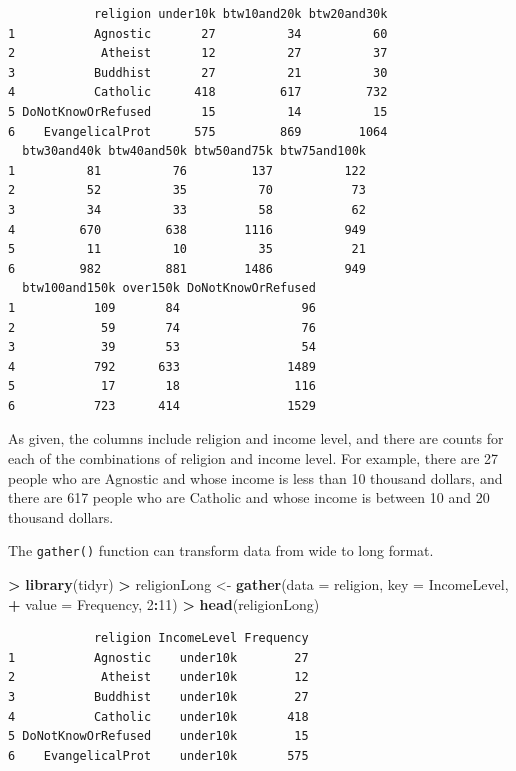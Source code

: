 \documentclass[]{krantz}
\makeatletter
\newenvironment{Shaded}{\begin{snugshade}}{\end{snugshade}}
\newcommand{\KeywordTok}[1]{\textcolor[rgb]{0.27,0.27,0.27}{\textbf{#1}}}
\newcommand{\DataTypeTok}[1]{\textcolor[rgb]{0.27,0.27,0.27}{#1}}
\newcommand{\DecValTok}[1]{\textcolor[rgb]{0.06,0.06,0.06}{#1}}
\newcommand{\StringTok}[1]{\textcolor[rgb]{0.5,0.5,0.5}{#1}}
\newcommand{\OperatorTok}[1]{\textcolor[rgb]{0.43,0.43,0.43}{\textbf{#1}}}
\newcommand{\NormalTok}[1]{#1}
\newenvironment{kframe}{%
\medskip{}
\setlength{\fboxsep}{.8em}
 \def\at@end@of@kframe{}%
 \ifinner\ifhmode%
  \def\at@end@of@kframe{\end{minipage}}%
  \begin{minipage}{\columnwidth}%
 \fi\fi%
 \def\FrameCommand##1{\hskip\@totalleftmargin \hskip-\fboxsep
 \colorbox{shadecolor}{##1}\hskip-\fboxsep
     \hskip-\linewidth \hskip-\@totalleftmargin \hskip\columnwidth}%
 \MakeFramed {\advance\hsize-\width
   \@totalleftmargin\z@ \linewidth\hsize
   \@setminipage}}%
 {\par\unskip\endMakeFramed%
 \at@end@of@kframe}
\renewenvironment{Shaded}{\begin{kframe}}{\end{kframe}}
\makeatother
\begin{document}
\begin{verbatim}
            religion under10k btw10and20k btw20and30k
1           Agnostic       27          34          60
2            Atheist       12          27          37
3           Buddhist       27          21          30
4           Catholic      418         617         732
5 DoNotKnowOrRefused       15          14          15
6    EvangelicalProt      575         869        1064
  btw30and40k btw40and50k btw50and75k btw75and100k
1          81          76         137          122
2          52          35          70           73
3          34          33          58           62
4         670         638        1116          949
5          11          10          35           21
6         982         881        1486          949
  btw100and150k over150k DoNotKnowOrRefused
1           109       84                 96
2            59       74                 76
3            39       53                 54
4           792      633               1489
5            17       18                116
6           723      414               1529
\end{verbatim}

As given, the columns include religion and income level, and there are
counts for each of the combinations of religion and income level. For
example, there are 27 people who are Agnostic and whose income is less
than 10 thousand dollars, and there are 617 people who are Catholic and
whose income is between 10 and 20 thousand dollars.

The \texttt{gather()} function can transform data from wide to long
format.

\begin{Shaded}
\begin{Highlighting}[]
\OperatorTok{>}\StringTok{ }\KeywordTok{library}\NormalTok{(tidyr)}
\OperatorTok{>}\StringTok{ }\NormalTok{religionLong <-}\StringTok{ }\KeywordTok{gather}\NormalTok{(}\DataTypeTok{data =}\NormalTok{ religion, }\DataTypeTok{key =}\NormalTok{ IncomeLevel, }
\OperatorTok{+}\StringTok{                        }\DataTypeTok{value =}\NormalTok{ Frequency, }\DecValTok{2}\OperatorTok{:}\DecValTok{11}\NormalTok{)}
\OperatorTok{>}\StringTok{ }\KeywordTok{head}\NormalTok{(religionLong)}
\end{Highlighting}
\end{Shaded}

\begin{verbatim}
            religion IncomeLevel Frequency
1           Agnostic    under10k        27
2            Atheist    under10k        12
3           Buddhist    under10k        27
4           Catholic    under10k       418
5 DoNotKnowOrRefused    under10k        15
6    EvangelicalProt    under10k       575
\end{verbatim}
\end{document}
